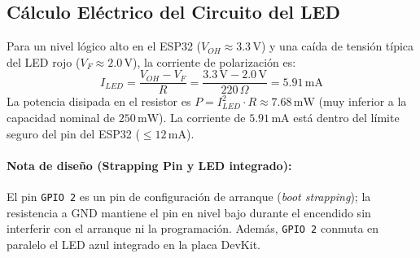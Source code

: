 \subsection{Cálculo Eléctrico del Circuito del LED}
Para un nivel lógico alto en el ESP32 ($V_{OH} \approx 3.3\,\text{V}$) y una caída de tensión típica del LED rojo ($V_F \approx 2.0\,\text{V}$), la corriente de polarización es:
\begin{equation}
    I_{LED} = \frac{V_{OH} - V_F}{R} = \frac{3.3\,\text{V} - 2.0\,\text{V}}{220\,\Omega} = 5.91\,\text{mA}
\end{equation}
La potencia disipada en el resistor es $P = I_{LED}^2 \cdot R \approx 7.68\,\text{mW}$ (muy inferior a la capacidad nominal de $250\,\text{mW}$). La corriente de $5.91\,\text{mA}$ está dentro del límite seguro del pin del ESP32 ($\le 12\,\text{mA}$).

\paragraph{Nota de diseño (Strapping Pin y LED integrado):} El pin \texttt{GPIO 2} es un pin de configuración de arranque (\textit{boot strapping}); la resistencia a GND mantiene el pin en nivel bajo durante el encendido sin interferir con el arranque ni la programación. Además, \texttt{GPIO 2} conmuta en paralelo el LED azul integrado en la placa DevKit.
